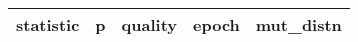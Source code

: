 \begin{longtable}{||c c c c c||}\small
    \centering
     statistic & p & quality & epoch & mut\_distn \\  [0.5ex]
     \hline

\end{longtable}
